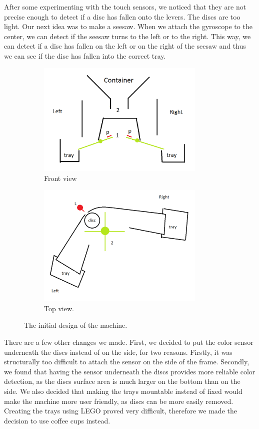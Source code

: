 \documentclass[a4paper,oneside,11pt]{article}
\begin{document}
After some experimenting with the touch sensors, we noticed that they are not precise enough to detect if a disc has fallen onto the levers. The discs are too light. Our next idea was to make a seesaw. When we attach the gyroscope to the center, we can detect if the seesaw turns to the left or to the right. This way, we can detect if a disc has fallen on the left or on the right of the seesaw and thus we can see if the disc has fallen into the correct tray.

\begin{figure}[H]
\begin{subfigure}{0.5\textwidth}
	\centering
	\includegraphics[width=80mm]{front}
	\caption{\label{firstfront}Front view}	
\end{subfigure}	
\begin{subfigure}{0.5\textwidth}
\centering
	\includegraphics[width=80mm]{top}
	\caption{\label{top}Top view.}
\end{subfigure}	
\caption{The initial design of the machine.}
\end{figure}

\newpage

There are a few other changes we made. First, we decided to put the color sensor underneath the discs instead of on the side, for two reasons. Firstly, it was structurally too difficult to attach the sensor on the side of the frame. Secondly, we found that having the sensor underneath the discs provides more reliable color detection, as the discs surface area is much larger on the bottom than on the side. We also decided that making the trays mountable instead of fixed would make the machine more user friendly, as discs can be more easily removed. Creating the trays using LEGO proved very difficult, therefore we made the decision to use coffee cups instead.
\end{document}
